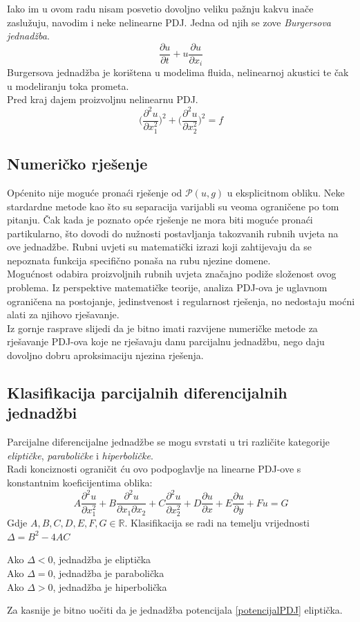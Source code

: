 \documentclass[zavrsnirad]{../fer}
\begin{document}
Iako im u ovom radu nisam posvetio
dovoljno veliku pažnju kakvu 
inače zaslužuju, navodim 
i neke nelinearne PDJ.
Jedna od njih se zove \textit{Burgersova jednadžba}.
$$\frac{\partial u}{\partial t} +
u \frac{\partial u}{\partial x_i}$$
Burgersova jednadžba je korištena u modelima fluida, 
nelinearnoj akustici te čak u modeliranju toka prometa. 
\\
Pred kraj dajem proizvoljnu nelinearnu PDJ. 
$$\Big(\frac{\partial^2 u}{\partial x_1 ^2}\Big)^2 +
\Big(\frac{\partial^2 u}{\partial x_2 ^2}\Big)^2 = f$$

\subsection{Numeričko rješenje}
Općenito nije moguće pronaći rješenje od $\mathcal{P}(u,g)$ 
u eksplicitnom obliku. Neke stardardne metode kao što 
su separacija varijabli su veoma ograničene po tom pitanju.
Čak kada je poznato opće rješenje ne mora biti moguće pronaći 
partikularno, što dovodi do nužnosti postavljanja takozvanih 
rubnih uvjeta na  ove jednadžbe. Rubni uvjeti su matematički izrazi 
koji zahtijevaju da se nepoznata funkcija specifično ponaša
na rubu njezine domene.
\bigskip
\\ 
Mogućnost odabira proizvoljnih rubnih uvjeta značajno 
podiže složenost ovog problema. Iz perspektive matematičke 
teorije, analiza PDJ-ova je uglavnom ograničena na  
postojanje, jedinstvenost i regularnost rješenja, no 
nedostaju moćni alati za njihovo rješavanje. 
\bigskip
\\ 
Iz gornje rasprave slijedi da je bitno imati 
razvijene numeričke metode za rješavanje PDJ-ova koje 
ne rješavaju danu parcijalnu jednadžbu, nego daju dovoljno 
dobru aproksimaciju njezina rješenja. 
\newpage 

\subsection{Klasifikacija parcijalnih diferencijalnih jednadžbi}
Parcijalne diferencijalne jednadžbe se mogu svrstati u 
tri različite kategorije \textit{eliptičke},
\textit{paraboličke} i \textit{hiperboličke}.
\\
Radi konciznosti ograničit ću ovo podpoglavlje na linearne PDJ-ove s 
konstantnim koeficijentima oblika:
$$
A\frac{\partial^2 u}{\partial x_1^2}
+ B \frac{\partial^2 u}{\partial x_1 \partial x_2}
+ C \frac{\partial^2 u}{\partial x_2^2}
+ D \frac{\partial u}{\partial x}
+ E \frac{\partial u}{\partial y}
+ F u = G
$$
Gdje $A,B,C,D,E,F,G \in \mathbb{R}$.
Klasifikacija se radi na temelju vrijednosti $\Delta = B^2 - 4AC$
\begin{center}
  Ako $\Delta < 0$, jednadžba je eliptička\\ 
  Ako $\Delta = 0$, jednadžba je parabolička\\ 
  Ako $\Delta > 0$, jednadžba je hiperbolička 
\end{center}
Za kasnije je bitno uočiti da je jednadžba
potencijala \ref{potencijalPDJ}
eliptička. 
\end{document}
